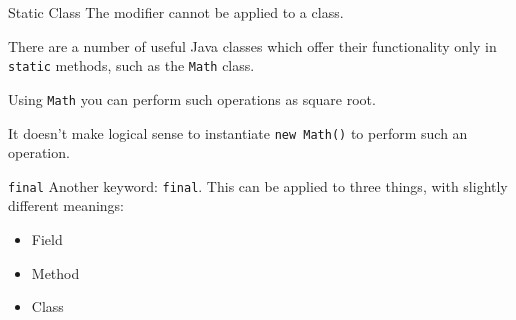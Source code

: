 \documentclass{beamer}
\begin{document}
\begin{frame}{Static Class}
The modifier cannot be applied to a class. 

There are a number of useful Java classes which offer their functionality only in \texttt{static} methods, such as the \texttt{Math} class. 

Using \texttt{Math} you can perform such operations as square root.

It doesn't make logical sense to instantiate \texttt{new Math()} to perform such an operation. 
\end{frame}



\begin{frame}{\texttt{final}}
Another keyword: \texttt{final}. This can be applied to three things, with slightly different meanings:
\begin{itemize}
	\item Field
	\item Method
	\item Class
\end{itemize}
\end{frame}
\end{document}
